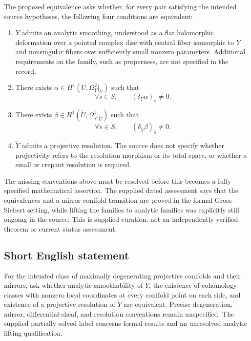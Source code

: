 \documentclass[11pt]{article}
\begin{document}
The proposed equivalence asks whether, for every pair satisfying the intended source hypotheses, the following four conditions are equivalent:
\begin{enumerate}
\item \(Y\) admits an analytic smoothing, understood as a flat holomorphic deformation over a pointed complex disc with central fiber isomorphic to \(Y\) and nonsingular fibers over sufficiently small nonzero parameters. Additional requirements on the family, such as properness, are not specified in the record.
\item There exists \(\alpha\in H^1(U,\Omega_Y^2|_U)\) such that
\[
\forall s\in S,\qquad (\delta_Y\alpha)_s\ne0.
\]
\item There exists \(\beta\in H^1(\check U,\Omega_{\check Y}^1|_{\check U})\) such that
\[
\forall\check s\in\check S,\qquad (\delta_{\check Y}\beta)_{\check s}\ne0.
\]
\item \(\check Y\) admits a projective resolution. The source does not specify whether projectivity refers to the resolution morphism or its total space, or whether a small or crepant resolution is required.
\end{enumerate}
The missing conventions above must be resolved before this becomes a fully specified mathematical assertion. The supplied dated assessment says that the equivalences and a mirror conifold transition are proved in the formal Gross--Siebert setting, while lifting the families to analytic families was explicitly still ongoing in the source. This is supplied curation, not an independently verified theorem or current status assessment.
\subsection{Short English statement}
For the intended class of maximally degenerating projective conifolds and their mirrors, ask whether analytic smoothability of \(Y\), the existence of cohomology classes with nonzero local coordinates at every conifold point on each side, and existence of a projective resolution of \(\check Y\) are equivalent. Precise degeneration, mirror, differential-sheaf, and resolution conventions remain unspecified. The supplied partially solved label concerns formal results and an unresolved analytic lifting qualification.
\end{document}
